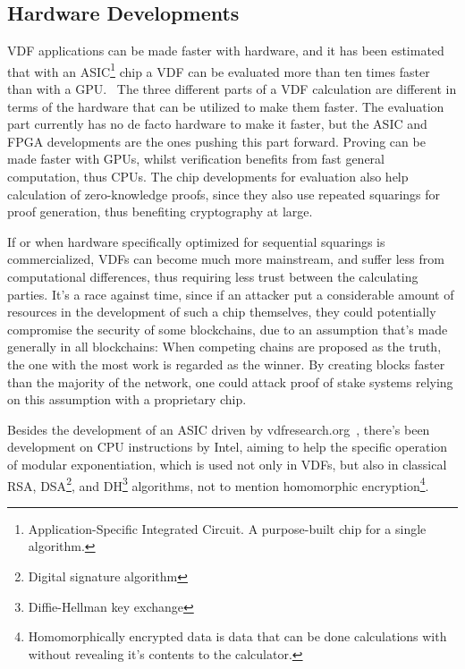\subsection{Hardware Developments}
VDF applications can be made faster with hardware, and it has been estimated that with an ASIC\footnote{Application-Specific Integrated Circuit. A purpose-built chip for a single algorithm.} chip a VDF can be evaluated more than ten times faster than with a GPU.~\cite{Stanford_Video2020-ap}
The three different parts of a VDF calculation are different in terms of the hardware that can be utilized to make them faster. The evaluation part currently has no de facto hardware to make it faster, but the ASIC and FPGA developments are the ones pushing this part forward. Proving can be made faster with GPUs, whilst verification benefits from fast general computation, thus CPUs.\cite{Protocol_Labs_Kelly_Olson2020-au} The chip developments for evaluation also help calculation of zero-knowledge proofs, since they also use repeated squarings for proof generation, thus benefiting cryptography at large.

If or when hardware specifically optimized for sequential squarings is commercialized, VDFs can become much more mainstream, and suffer less from computational differences, thus requiring less trust between the calculating parties. It's a race against time, since if an attacker put a considerable amount of resources in the development of such a chip themselves, they could potentially compromise the security of some blockchains, due to an assumption that's made generally in all blockchains: When competing chains are proposed as the truth, the one with the most work is regarded as the winner. By creating blocks faster than the majority of the network, one could attack proof of stake systems relying on this assumption with a proprietary chip.

Besides the development of an ASIC driven by vdfresearch.org~\cite{noauthor_undated-hk}, there's been development on CPU instructions by Intel, aiming to help the specific operation of modular exponentiation, which is used not only in VDFs, but also in classical RSA, DSA\footnote{Digital signature algorithm}, and DH\footnote{Diffie-Hellman key exchange} algorithms, not to mention homomorphic encryption\footnote{Homomorphically encrypted data is data that can be done calculations with without revealing it's contents to the calculator.}.~\cite{Drucker2019-cx} 
